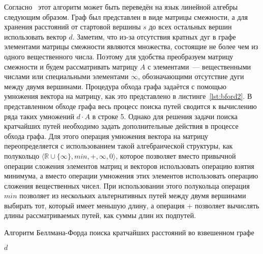 Согласно~\cite{kepner2011graph} этот алгоритм может быть переведён на язык линейной алгебры следующим образом. Граф был представлен в виде матрицы смежности, а для хранения расстояний от стартовой вершины $s$ до всех остальных вершин использовать вектор $d$. Заметим, что из-за отсутствия кратных дуг в графе элементами матрицы смежности являются множества, состоящие не более чем из одного вещественного числа. Поэтому для удобства преобразуем матрицу смежности и будем рассматривать матрицу $A$ с элементами~--- вещественными числами или специальными элементами $\infty$, обозначающими отсутствие дуги между двумя вершинами. Процедура обхода графа задаётся с помощью умножения вектора на матрицу, как это представлено в листинге~\ref{lst:bford2}. В представленном обходе графа весь процесс поиска путей сводится к вычислению ряда таких умножений $d \cdot A$ в строке 5. Однако для решения задачи поиска кратчайших путей необходимо задать дополнительные действия в процессе обхода графа. Для этого операция умножения вектора на матрицу  переопределяется с использованием такой алгебраической структуры, как полукольцо  $\langle \mathbb{R} \cup \{\infty\}, min, +, \infty, 0 \rangle$, которое позволяет вместо привычной операции сложения элементов матриц и векторов использовать операцию взятия минимума, а вместо операции умножения этих элементов использовать операцию сложения вещественных чисел. При использовании этого полукольца операция $min$ позволяет из нескольких альтернативных путей между двумя вершинами выбирать тот, который имеет меньшую длину, а операция $+$ позволяет вычислять длины рассматриваемых путей, как суммы длин их подпутей.

\begin{algorithm}
\begin{algorithmic}[1]
\caption{Алгоритм Беллмана-Форда поиска кратчайших расстояний во взвешенном графе}
\label{lst:bford1}
    \EndFor
        \EndIf
    \EndFor
            \State \Return {}
        \EndIf
    \EndFor
    \State \Return $d$
\EndFunction
\end{algorithmic}
\end{algorithm}

